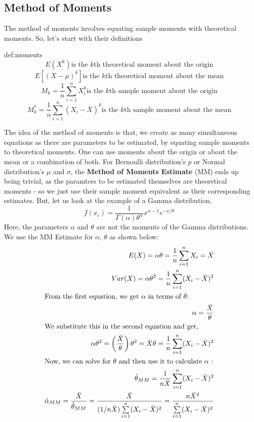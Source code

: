 \subsection{Method of Moments}
The method of moments involves equating sample moments with theoretical moments. So, let's start with their definitions \\
	
	\begin{defs}[Moments]{def:moments}
		\[ E(X^k) \text{is the $k$th theoretical moment about the origin} \]
		\[ E\left[(X-\mu)^k\right] \text{is the $k$th theoretical moment about the mean} \]
		\[ M_k=\dfrac{1}{n}\sum\limits_{i=1}^n X_i^k \text{is the $k$th sample moment about the origin} \]
		\[ M_k^\ast =\dfrac{1}{n}\sum\limits_{i=1}^n (X_i-\bar{X})^k \text{is the $k$th sample moment about the mean} \]
	\end {defs}
	
The idea of the method of moments is that, we create as many simultaneous equations as there are parameters to be estimated, by equating sample moments to theoretical moments. One can use moments about the origin or about the mean or a combination of both. For Bernoulli distribution's $p$ or Normal distribution's $\mu$ and $\sigma$, the \textbf{Method of Moments Estimate} (MM) ends up being trivial, as the paramters to be estimated themselves are theoretical moments - so we just use their sample moment equivalent as their corresponding estimates. But, let us look at the example of a Gamma distribution,
	\[ f(x_i)=\dfrac{1}{\Gamma(\alpha) \theta^\alpha}x^{\alpha-1}e^{-x/\theta} \] 
Here, the parameters $\alpha$ and $\theta$ are not the moments of the Gamma distributions. We use the MM Estimate for $\alpha$, $\theta$ as shown below:
	\begin{align*}
		E(X)=\alpha\theta=\dfrac{1}{n}\sum\limits_{i=1}^n X_i=\bar{X} \\
		Var(X)=\alpha\theta^2=\dfrac{1}{n}\sum\limits_{i=1}^n (X_i-\bar{X})^2 \\
		\intertext{From the first equation, we get $\alpha$ in terms of $\theta$:} 
		\alpha=\dfrac{\bar{X}}{\theta} \\
		\intertext{We substitute this in the second equation and get,} 
		\alpha\theta^2=\left(\dfrac{\bar{X}}{\theta}\right)\theta^2=\bar{X}\theta=\dfrac{1}{n}\sum\limits_{i=1}^n (X_i-\bar{X})^2 \\
		\intertext{Now, we can solve for $\theta$ and then use it to calculate $\alpha$ :} 
		\hat{\theta}_{MM}=\dfrac{1}{n\bar{X}}\sum\limits_{i=1}^n (X_i-\bar{X})^2 \\
		\hat{\alpha}_{MM}=\dfrac{\bar{X}}{\hat{\theta}_{MM}}=\dfrac{\bar{X}}{(1/n\bar{X})\sum\limits_{i=1}^n (X_i-\bar{X})^2}=\dfrac{n\bar{X}^2}{\sum\limits_{i=1}^n (X_i-\bar{X})^2}
	\end{align*}
	
